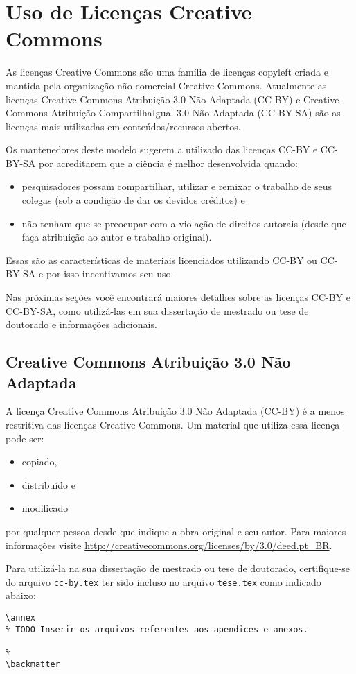 \chapter{Uso de Licenças Creative Commons}
As licenças Creative Commons são uma família de licenças copyleft criada e
mantida pela organização não comercial Creative Commons. Atualmente as licenças
Creative Commons Atribuição 3.0 Não Adaptada (CC-BY) e Creative Commons
Atribuição-CompartilhaIgual 3.0 Não Adaptada (CC-BY-SA) são as licenças mais
utilizadas em conteúdos/recursos abertos.

Os mantenedores deste modelo sugerem a utilizado das licenças CC-BY e CC-BY-SA
por acreditarem que a ciência é melhor desenvolvida quando:
\begin{itemize}
  \item pesquisadores possam compartilhar, utilizar e remixar o trabalho de seus
    colegas (sob a condição de dar os devidos créditos) e
  \item não tenham que se preocupar com a violação de direitos autorais (desde
    que faça atribuição ao autor e trabalho original).
\end{itemize}
Essas são as características de materiais licenciados utilizando CC-BY ou
CC-BY-SA e por isso incentivamos seu uso.

Nas próximas seções você encontrará maiores detalhes sobre as licenças CC-BY e
CC-BY-SA, como utilizá-las em sua dissertação de mestrado ou tese de doutorado e
informações adicionais.

\section{Creative Commons Atribuição 3.0 Não Adaptada}
A licença Creative Commons Atribuição 3.0 Não Adaptada (CC-BY) é a menos restritiva das
licenças Creative Commons. Um material que utiliza essa licença pode ser:
\begin{itemize}
  \item copiado,
  \item distribuído e
  \item modificado
\end{itemize}
por qualquer pessoa desde que indique a obra original e seu autor. Para maiores
informações visite
\url{http://creativecommons.org/licenses/by/3.0/deed.pt_BR}.


Para utilizá-la na sua dissertação de mestrado ou tese de doutorado,
certifique-se do arquivo \lstinline+cc-by.tex+ ter sido incluso no arquivo
\lstinline+tese.tex+ como indicado abaixo:
\begin{lstlisting}
\annex
% TODO Inserir os arquivos referentes aos apendices e anexos.

%
\backmatter
\end{lstlisting}

